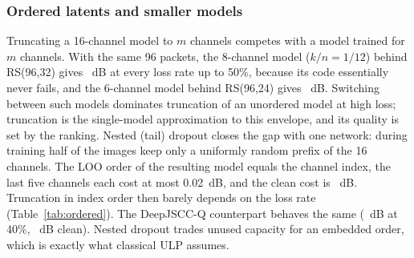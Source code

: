 \documentclass[journal]{IEEEtran}
\begin{document}
\subsubsection{Ordered latents and smaller models}
Truncating a 16-channel model to $m$ channels competes with a model trained for $m$ channels. With the
same 96 packets, the 8-channel model ($k/n=1/12$) behind RS(96,32) gives \KnTwelveClean~dB at every loss
rate up to 50\%, because its code essentially never fails, and the 6-channel model behind RS(96,24) gives
\KnSixteenForty~dB. Switching between such models dominates truncation of an unordered model at high
loss; truncation is the single-model approximation to this envelope, and its quality is set by the
ranking. Nested (tail) dropout \cite{rippel2014nested} closes the gap with one network: during training
half of the images keep only a uniformly random prefix of the 16 channels. The LOO order of the resulting
model equals the channel index, the last five channels each cost at most 0.02~dB, and the clean cost is
\OrderedCleanCost~dB. Truncation in index order then barely depends on the loss rate
(Table~\ref{tab:ordered}). The DeepJSCC-Q counterpart behaves the same (\OrderedDeepTruncForty~dB at 40\%,
\OrderedDeepClean~dB clean). Nested dropout trades unused capacity for an embedded order, which is exactly
what classical ULP assumes.

\begin{table}[t]\centering\caption{Ordered (nested-dropout) ADJSCC-Q model: test PSNR (dB)}\label{tab:ordered}
\end{table}
\end{document}
